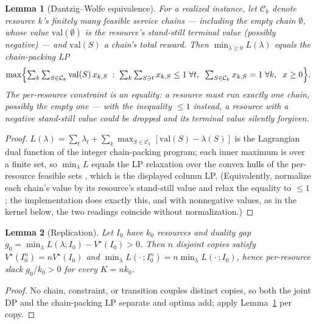 \documentclass[11pt]{article}
\newtheorem{lemma}{Lemma}
\newcommand{\Vstar}{V^{\star}}
\begin{document}
\begin{lemma}[Dantzig--Wolfe equivalence]
\label{lem:dw}
For a realized instance, let $\mathcal{C}_k$ denote resource $k$'s
finitely many feasible service chains --- including the empty chain
$\emptyset$, whose value $\mathrm{val}(\emptyset)$ is the resource's
stand-still terminal value (possibly negative) --- and
$\mathrm{val}(S)$ a chain's total reward. Then
$\min_{\lambda \geq 0} L(\lambda)$ equals the chain-packing LP
\begin{equation}
  \max \Bigl\{ \textstyle\sum_k \sum_{S \in \mathcal{C}_k}
  \mathrm{val}(S)\, x_{k,S} \;:\;
  \sum_k \sum_{S \ni t} x_{k,S} \leq 1 \;\forall t,\;\;
  \sum_{S \in \mathcal{C}_k} x_{k,S} = 1 \;\forall k,\;\; x \geq 0 \Bigr\}.
  \label{eq:chainlp}
\end{equation}
The per-resource constraint is an equality: a resource must run
exactly one chain, possibly the empty one --- with the inequality
$\leq 1$ instead, a resource with a negative stand-still value could
be dropped and its terminal value silently forgiven.
\end{lemma}

\begin{proof}
$L(\lambda) = \sum_t \lambda_t + \sum_k \max_{S \in \mathcal{C}_k}
[\mathrm{val}(S) - \lambda(S)]$ is the Lagrangian dual
function of the integer chain-packing program; each inner maximum is
over a finite set, so $\min_{\lambda} L$ equals the LP relaxation over
the convex hulls of the per-resource feasible sets
\citep[Dantzig--Wolfe;][]{geoffrion1974lagrangean}, which is the
displayed column LP. (Equivalently, normalize each chain's value by
its resource's stand-still value and relax the equality to $\leq 1$;
the implementation does exactly this, and with nonnegative values, as
in the kernel below, the two readings coincide without
normalization.)
\end{proof}

\begin{lemma}[Replication]
\label{lem:replication}
Let $I_0$ have $k_0$ resources and duality gap
$g_0 = \min_{\lambda} L(\lambda; I_0) - \Vstar(I_0) > 0$. Then $n$
disjoint copies satisfy $\Vstar(I_0^n) = n \Vstar(I_0)$ and
$\min_{\lambda} L(\cdot\,; I_0^n) = n \min_{\lambda} L(\cdot\,; I_0)$,
hence per-resource slack $g_0 / k_0 > 0$ for every $K = n k_0$.
\end{lemma}

\begin{proof}
No chain, constraint, or transition couples distinct copies, so both the
joint DP and the chain-packing LP separate and optima add; apply
Lemma~\ref{lem:dw} per copy.
\end{proof}
\end{document}
